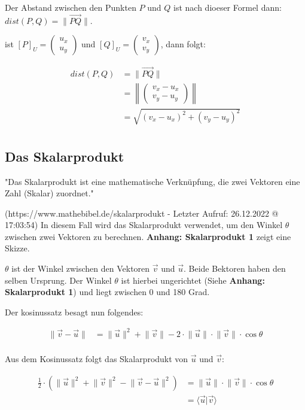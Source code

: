 \documentclass{article}
\newcommand{\m}[1]{\begin{pmatrix}#1\end{pmatrix}}
\begin{document}
    Der Abstand zwischen den Punkten $P$ und $Q$ ist nach dioeser Formel dann:
    $dist(P, Q) = \lVert \vec{PQ} \rVert$.
    
    ist ${[P]}_{U} = \m{u_x \\ u_y}$ und ${[Q]}_{U} = \m{v_x \\ v_y}$, dann folgt:

    \[
      \begin{split}
        dist(P, Q) &= \lVert \vec{PQ} \rVert \\
        &= \left \lVert \m{v_x - u_x \\ v_y - u_y} \right \rVert \\
        &= \sqrt{(v_x - u_x)^2 + (v_y - u_y)^2} \\
      \end{split}  
    \] 

    \subsection{Das Skalarprodukt}
    
    "Das Skalarprodukt ist eine mathematische Verknüpfung, die zwei Vektoren eine Zahl (Skalar) zuordnet."

    (https://www.mathebibel.de/skalarprodukt - Letzter Aufruf: 26.12.2022 @ 17:03:54)
    In diesem Fall wird das Skalarprodukt verwendet, um den Winkel $\theta$ zwischen zwei Vektoren zu berechnen.
    \textbf{Anhang: Skalarprodukt 1} zeigt eine Skizze.
    
    $\theta$ ist der Winkel zwischen den Vektoren $\vec{v}$ und $\vec{u}$.
    Beide Bektoren haben den selben Ursprung. Der Winkel $\theta$ ist hierbei ungerichtet
    (Siehe \textbf{Anhang: Skalarprodukt 1}) und liegt zwischen 0 und 180 Grad.
    
    Der kosinussatz besagt nun folgendes:

    \[
        \begin{split}
            \lVert \vec{v} - \vec{u} \rVert &= \lVert \vec{u} \rVert ^2 + \lVert \vec{v} \rVert - 2 \cdot \lVert \vec{u} \rVert \cdot \lVert \vec{v} \rVert \cdot \cos \theta \\
        \end{split}  
    \]

    Aus dem Kosinussatz folgt das Skalarprodukt von $\vec{u}$ und $\vec{v}$:

    \[
        \begin{split}
            \frac{1}{2} \cdot \left ( \lVert \vec{u} \rVert ^2 + \lVert \vec{v} \rVert ^2 - \lVert \vec{v} - \vec{u} \rVert ^2 \right ) &= \lVert \vec{u} \rVert \cdot \lVert \vec{v} \rVert \cdot \cos \theta \\
            &= \langle \vec{u} \vert \vec{v} \rangle \\
        \end{split}  
    \]
\end{document}
